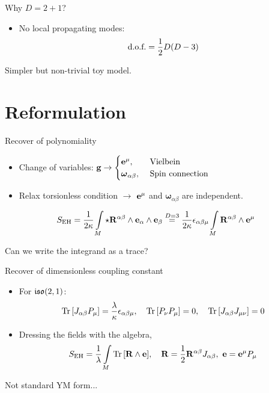 \documentclass{beamer}
\begin{document}
\begin{frame}{Why $D=2+1$?}
    \begin{itemize}
        \item No local propagating modes:
        $$\textnormal{d.o.f.} = \frac12 D\qty(D-3)$$
    \end{itemize}
    Simpler but non-trivial toy model.
\end{frame}

\section{Reformulation}
\begin{frame}{Recover of polynomiality}
    \begin{itemize}
        \item Change of variables: $\vb g\rightarrow \begin{cases}\vb e^\mu,&\textnormal{ Vielbein} \\\boldsymbol\omega_{\alpha\beta},&\textnormal{ Spin connection} \end{cases}$\pause
        \item Relax torsionless condition $\rightarrow$ $\vb e^\mu$ and $\boldsymbol\omega_{\alpha\beta}$ are independent.\pause
    \end{itemize}

    \vspace{0.7cm}

    $$S_{\textnormal{EH}}= \frac{1}{2\kappa}\int\limits_M\star\vb R^{\alpha\beta}\wedge \vb e_\alpha\wedge \vb e_\beta\overset{D=3}{=}\frac{1}{2\kappa}\epsilon_{\alpha\beta\mu}\int\limits_M \vb R^{\alpha\beta}\wedge \vb e^\mu$$\pause
    
    \vspace{0.7cm}
    
    Can we write the integrand as a trace?
\end{frame}

\begin{frame}{Recover of dimensionless coupling constant}
    \begin{itemize}
        \item For $\mathfrak{iso}\qty(2,1)$: $$\Tr\qty[J_{\alpha\beta}P_\mu]=\frac{\lambda}{\kappa}\epsilon_{\alpha\beta\mu},\ \ \ \Tr\qty[P_\nu P_\mu]=0,\ \ \ \Tr\qty[J_{\alpha\beta}J_{\mu\nu}]=0$$\pause
        \item Dressing the fields with the algebra,
        $$S_{\textnormal{EH}}=\frac{1}{\lambda}\int\limits_M \Tr\qty[\vb R\wedge \vb e],\ \ \ \vb R=\frac12\vb R^{\alpha\beta}J_{\alpha\beta},\ \vb e=\vb e^\mu P_\mu$$\pause
    \end{itemize}

    \vspace{0.6cm}

    Not standard YM form...
\end{frame}
\end{document}
